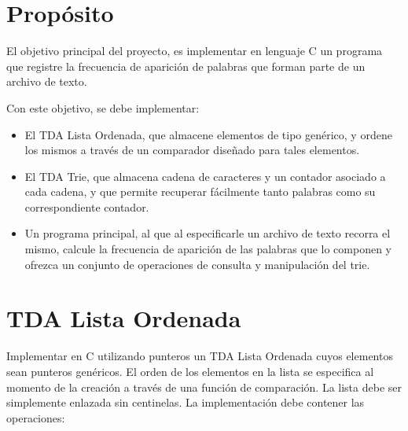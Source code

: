 \documentclass[12pt,a4paper]{article}
\begin{document}

\section*{Propósito}
El objetivo principal del proyecto, es implementar en lenguaje C un programa que registre la frecuencia de aparición de palabras que forman parte de un archivo de texto. 

Con este objetivo, se debe implementar:
\begin{itemize}
	
	\item El TDA Lista Ordenada, que almacene elementos de tipo genérico, y ordene los mismos a través de un comparador diseñado para tales elementos.
	
	\item El TDA Trie, que almacena cadena de caracteres y un contador asociado a cada cadena, y que permite recuperar fácilmente tanto palabras como su correspondiente contador.
	
	\item Un programa principal, al que al especificarle un archivo de texto recorra el mismo, calcule la frecuencia de aparición de las palabras que lo componen y ofrezca un conjunto de operaciones de consulta y manipulación del trie.
	
\end{itemize}

\section{TDA Lista Ordenada}
Implementar en C utilizando punteros un TDA Lista Ordenada cuyos elementos sean punteros genéricos. El orden de los elementos en la lista se especifica al momento de la creación a través de una función de comparación. La lista debe ser simplemente enlazada sin centinelas. La implementación debe contener las operaciones:
\end{document}
